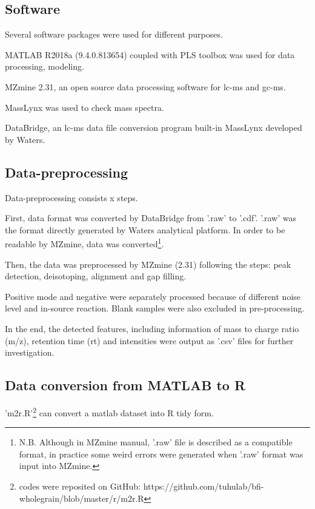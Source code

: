 \subsection{Software}
Several software packages were used for different purposes.

MATLAB R2018a (9.4.0.813654) coupled with PLS toolbox was used for data processing, modeling.

MZmine 2.31, an open source data processing software for \acrshort{lc-ms} and \acrshort{gc-ms}. 

MassLynx was used to check mass spectra.

DataBridge, an \acrshort{lc-ms} data file conversion program built-in MassLynx developed by Waters.


\subsection{Data-preprocessing}
Data-preprocessing consists x steps.

First, data format was converted by DataBridge from '.raw' to '.cdf'. '.raw' was the format directly generated by Waters analytical platform. In order to be readable by MZmine, data was converted\footnote{N.B. Although in MZmine manual, '.raw' file is described as a compatible format, in practice some weird errors were generated when '.raw' format was input into MZmine.}.

Then, the data was preprocessed by MZmine (2.31) following the steps: peak detection, deisotoping, alignment and gap filling.

Positive mode and negative were separately processed because of different noise level and in-source reaction. Blank samples were also excluded in pre-processing.

In the end, the detected features, including information of mass to charge ratio (m/z), retention time (rt) and intensities were output as '.csv' files for further investigation.

\subsection{Data conversion from MATLAB to R}
'm2r.R'\footnote{codes were reposited on GitHub: https://github.com/tuhulab/bfi-wholegrain/blob/master/r/m2r.R} can convert a matlab dataset into R tidy form.